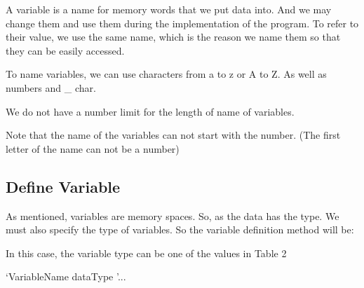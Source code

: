 \documentclass[11pt,fleqn]{book}
\begin{document}
A variable is a name for memory words that we put data into. And we may change them and use them during the implementation of the program.
To refer to their value, we use the same name, which is the reason we name them so that they can be easily accessed.

To name variables, we can use characters from a to z or A to Z. As well as numbers and \_ char.

We do not have a number limit for the length of name of variables.

Note that the name of the variables can not start with the number. (The first letter of the name can not be a number)


\subsection{Define Variable}


As mentioned, variables are memory spaces. So, as the data has the type. We must also specify the type of variables.
So the variable definition method will be:

In this case, the variable type can be one of the values in Table 2

`VariableName dataType '...
\end{document}

